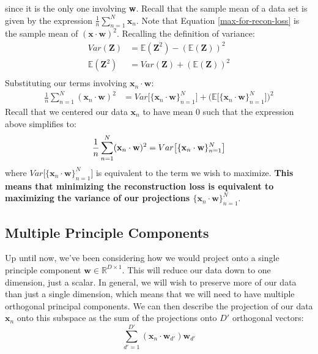 since it is the only one involving \textbf{w}. Recall that the sample mean of a data set is given by the expression $\frac{1}{n} \sum_{n=1}^{N} \textbf{x}_{n}$. Note that Equation \ref{max-for-recon-loss} is the sample mean of $(\textbf{x} \cdot \textbf{w})^{2}$. Recalling the definition of variance:
\begin{align*}
    Var(\textbf{Z}) &= \mathbb{E}(\textbf{Z}^{2}) - (\mathbb{E}(\textbf{Z}))^{2} \\
    \mathbb{E}(\textbf{Z}^{2}) &= Var(\textbf{Z}) + (\mathbb{E}(\textbf{Z}))^{2} \\
\end{align*}
Substituting our terms involving $\textbf{x}_{n} \cdot \textbf{w}$:
\begin{align*}
    \frac{1}{n} \sum_{n=1}^{N} (\textbf{x}_{n} \cdot \textbf{w})^{2} &= Var\big[\{\textbf{x}_{n} \cdot \textbf{w}\}_{n=1}^{N}\big] + \big( \mathbb{E} \big[\{\textbf{x}_{n} \cdot \textbf{w}\}_{n=1}^{N}\big] \big)^{2}
\end{align*}
Recall that we centered our data $\textbf{x}_{n}$ to have mean 0 such that the expression above simplifies to:
\begin{equation} \label{variance-equivalence}
    \frac{1}{n} \sum_{n=1}^{N} (\textbf{x}_{n} \cdot \textbf{w})^{2} = Var\big[\{\textbf{x}_{n} \cdot \textbf{w}\}_{n=1}^{N}\big] \\
\end{equation}
where $Var\big[\{\textbf{x}_{n} \cdot \textbf{w}\}_{n=1}^{N}\big]$ is equivalent to the term we wish to maximize. \textbf{This means that minimizing the reconstruction loss is equivalent to maximizing the variance of our projections $\{\textbf{x}_{n} \cdot \textbf{w}\}_{n=1}^{N}$}.


\subsection{Multiple Principle Components}
Up until now, we've been considering how we would project onto a single principle component $\textbf{w} \in \mathbb{R}^{D \times 1}$. This will reduce our data down to one dimension, just a scalar. In general, we will wish to preserve more of our data than just a single dimension, which means that we will need to have multiple orthogonal principal components. We can then describe the projection of our data $\textbf{x}_{n}$ onto this subspace as the sum of the projections onto $D'$ orthogonal vectors:
\begin{equation} \label{orthogonal-projections}
    \sum_{d'=1}^{D'} (\textbf{x}_{n} \cdot \textbf{w}_{d'})\textbf{w}_{d'}
\end{equation}

